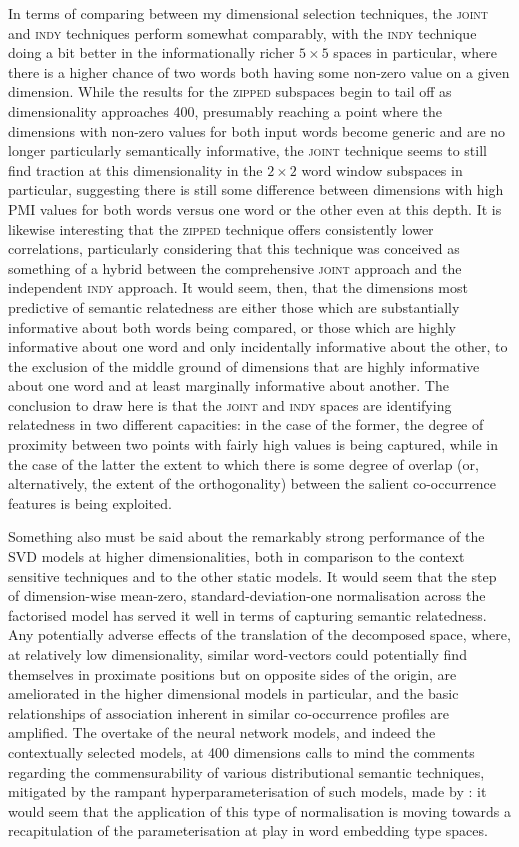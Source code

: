 In terms of comparing between my dimensional selection techniques, the \textsc{joint} and \textsc{indy} techniques perform somewhat comparably, with the \textsc{indy} technique doing a bit better in the informationally richer $5 \times 5$ spaces in particular, where there is a higher chance of two words both having some non-zero value on a given dimension.  While the results for the \textsc{zipped} subspaces begin to tail off as dimensionality approaches 400, presumably reaching a point where the dimensions with non-zero values for both input words become generic and are no longer particularly semantically informative, the \textsc{joint} technique seems to still find traction at this dimensionality in the $2 \times 2$ word window subspaces in particular, suggesting there is still some difference between dimensions with high PMI values for both words versus one word or the other even at this depth.  It is likewise interesting that the \textsc{zipped} technique offers consistently lower correlations, particularly considering that this technique was conceived as something of a hybrid between the comprehensive \textsc{joint} approach and the independent \textsc{indy} approach.  It would seem, then, that the dimensions most predictive of semantic relatedness are either those which are substantially informative about both words being compared, or those which are highly informative about one word and only incidentally informative about the other, to the exclusion of the middle ground of dimensions that are highly informative about one word and at least marginally informative about another.  The conclusion to draw here is that the \textsc{joint} and \textsc{indy} spaces are identifying relatedness in two different capacities: in the case of the former, the degree of proximity between two points with fairly high values is being captured, while in the case of the latter the extent to which there is some degree of overlap (or, alternatively, the extent of the orthogonality) between the salient co-occurrence features is being exploited.

Something also must be said about the remarkably strong performance of the SVD models at higher dimensionalities, both in comparison to the context sensitive techniques and to the other static models.  It would seem that the step of dimension-wise mean-zero, standard-deviation-one normalisation across the factorised model has served it well in terms of capturing semantic relatedness.  Any potentially adverse effects of the translation of the decomposed space, where, at relatively low dimensionality, similar word-vectors could potentially find themselves in proximate positions but on opposite sides of the origin, are ameliorated in the higher dimensional models in particular, and the basic relationships of association inherent in similar co-occurrence profiles are amplified.  The overtake of the neural network models, and indeed the contextually selected models, at 400 dimensions calls to mind the comments regarding the commensurability of various distributional semantic techniques, mitigated by the rampant hyperparameterisation of such models, made by \cite{LevyEA2014b}: it would seem that the application of this type of normalisation is moving towards a recapitulation of the parameterisation at play in word embedding type spaces.

